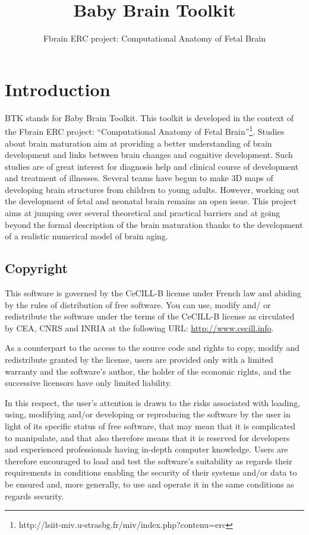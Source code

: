 \documentclass[a4paper,10pt]{article}
\title{Baby Brain Toolkit}
\author{Fbrain ERC project: Computational Anatomy of Fetal Brain}
\begin{document}
\maketitle
\tableofcontents
\setcounter{tocdepth}{5}
\setcounter{secnumdepth}{5}

\section{Introduction}

BTK stands for Baby Brain Toolkit. This toolkit is developed in the context of
the Fbrain ERC project: ``Computational Anatomy of Fetal
Brain''\footnote{http://lsiit-miv.u-strasbg.fr/miv/index.php?contenu=erc}. 
Studies about brain maturation aim at providing a better understanding of brain
development and links between brain changes and cognitive development. Such
studies are of great interest for diagnosis help and clinical course of
development and treatment of illnesses. Several teams have begun to make 3D maps
of developing brain structures from children to young adults. However, working
out the development of fetal and neonatal brain remains an open issue. This
project aims at jumping over several theoretical and practical barriers and at
going beyond the formal description of the brain maturation thanks to the
development of a realistic numerical model of brain aging.

\subsection{Copyright}
This software is governed by the CeCILL-B license under French law and
abiding by the rules of distribution of free software.  You can  use, 
modify and/ or redistribute the software under the terms of the CeCILL-B
license as circulated by CEA, CNRS and INRIA at the following URL: \url{http://www.cecill.info}. 

As a counterpart to the access to the source code and rights to copy,
modify and redistribute granted by the license, users are provided only
with a limited warranty  and the software's author,  the holder of the
economic rights,  and the successive licensors  have only  limited
liability. 

In this respect, the user's attention is drawn to the risks associated
with loading,  using,  modifying and/or developing or reproducing the
software by the user in light of its specific status of free software,
that may mean  that it is complicated to manipulate,  and  that  also
therefore means  that it is reserved for developers  and  experienced
professionals having in-depth computer knowledge. Users are therefore
encouraged to load and test the software's suitability as regards their
requirements in conditions enabling the security of their systems and/or 
data to be ensured and,  more generally, to use and operate it in the 
same conditions as regards security. 
\end{document}
